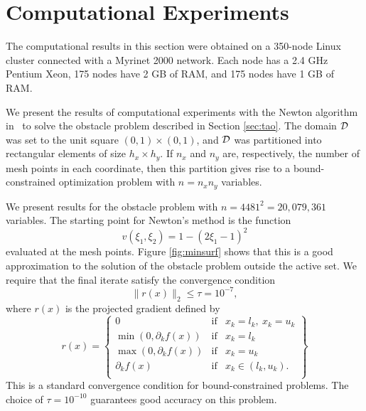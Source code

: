 \section{Computational Experiments}
\label{sec:comp}

The computational
results in this section were obtained on a 350-node
Linux cluster connected with a Myrinet 2000 network.  Each node has a 2.4 GHz
Pentium Xeon, 175 nodes have 2 GB of RAM, and 175 nodes have
1 GB of RAM.  

We present the results of computational experiments with the
Newton algorithm in \tao\ to solve the obstacle problem
described in Section \ref{sec:tao}.  The domain $ \mbox{$\cal D$} $ was
set to the unit square $ (0,1) \times (0,1) $, and $ \mbox{$\cal D$} $
was partitioned into rectangular elements of size $ h_x
\times h_y $.
If $ n_x $ and $ n_y $ are, respectively,
the number of mesh points in each coordinate,
then this partition gives rise to a bound-constrained
optimization problem  with $ n = n_x n_y $
variables.

We present results for the obstacle problem with 
$ n = 4481^2 = 20,079,361 $
variables. 
The starting point for Newton's method is the function
\begin{equation}
  \label{eq:xs}
v(\xi_1, \xi_2 ) =   1 - (2 \xi_1 - 1)^2 
\end{equation}
evaluated at the
mesh points. 
Figure \ref{fig:minsurf} shows that this is a good approximation
to the solution of the obstacle problem outside the
active set.
We require that the final iterate satisfy
the convergence condition
\begin{equation}
  \label{eq:conv-condition}
 \| r(x) \|_2 \le \tau = 10^{-7} ,
\end{equation}
where $ r(x) $ is the projected gradient defined by
\[
r (x) =
\left \{ 
  \begin{array}{lcl}
  0 & \mathrm{if} & 
  x_k = l_k , \ x_k = u_k \\
  \min ( 0, \partial_k f (x) ) & \mathrm{if} & x_k = l_k  \\
  \max ( 0, \partial_k f (x) ) & \mathrm{if} & x_k = u_k  \\
  \partial_k f(x) & \mathrm{if} &   x_k \in (l_k , u_k ).   \\
  \end{array}
\right \}
\]
This is a standard convergence condition for bound-constrained
problems. The choice of $ \tau = 10^{-10} $ guarantees good
accuracy on this problem.


